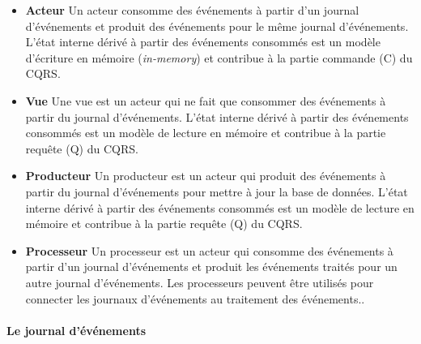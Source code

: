 \begin{itemize}
	\item \textbf{Acteur} Un acteur consomme des événements à partir d'un journal 
	d'événements et produit des événements pour le même journal d'événements. 
	L'état interne dérivé à partir des événements consommés est un modèle 
	d'écriture 
	en mémoire (\textit{in-memory}) et contribue à la partie commande (C) du 
	CQRS.
	\item \textbf{Vue} Une vue est un acteur qui ne fait que consommer des 
	événements à 
	partir du journal d'événements. L'état interne dérivé à partir des événements 
	consommés est un modèle de lecture en mémoire et contribue à la partie 
	requête (Q) du CQRS.
	\item \textbf{Producteur} Un producteur est un acteur qui produit des 
	événements à 
	partir 
	du journal d'événements pour mettre à jour la base de données. L'état interne 
	dérivé 
	à partir des événements consommés est un modèle de lecture en mémoire et 
	contribue à la partie requête (Q) du CQRS.
	\item \textbf{Processeur} Un processeur est un acteur qui consomme des 
	événements 
	à 
	partir d'un journal d'événements et produit les événements traités pour un autre 
	journal d'événements. Les processeurs peuvent être utilisés pour connecter les 
	journaux d'événements au traitement des événements..
\end{itemize}


\paragraph{Le journal d'événements}

